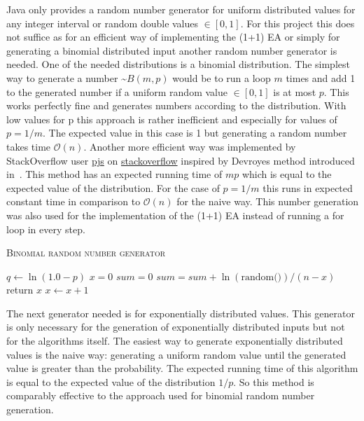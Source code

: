 Java only provides a random number generator for uniform distributed values for any integer interval or random double values $\in [0,1]$. 
For this project this does not suffice as for an efficient way of implementing the (1+1) EA or simply for generating a binomial distributed input another random number generator is needed. One of the needed distributions is a binomial distribution. The simplest way to generate a number \textasciitilde$B(m,p)$ would be to run a loop $m$ times and add 1 to the generated number if a uniform random value $\in [0,1]$ is at most $p$. This works perfectly fine and generates numbers according to the distribution. With low values for p this approach is rather inefficient and especially for values of $p=1/m$. The expected value in this case is 1 but generating a random number takes time $\mathcal{O}(n)$. Another more efficient way was implemented by StackOverflow user \href{https://stackoverflow.com/users/2166798/pjs}{pjs} on \href{https://stackoverflow.com/questions/23561551/a-efficient-binomial-random-number-generator-code-in-java}{stackoverflow} inspired by Devroyes method introduced in~\cite{devroye2006nonuniform}. This method has an expected running time of $mp$ which is equal to the expected value of the distribution. For the case of $p=1/m$ this runs in expected constant time in comparison to $\mathcal{O}(n)$ for the naive way. This number generation was also used for the implementation of the (1+1) EA instead of running a for loop in every step.

\begin{algorithm}[bt]
      \caption{\textsc{Binomial random number generator}}\label{alg:binomialRNG}

      \DontPrintSemicolon %
      $q \leftarrow \ln(1.0 - p)$\;
      $x = 0$\;
      $sum = 0$\;
      {
            $sum = sum +\ln(\text{random()}) / (n - x)$\; \tcp{random() generates a random value $\in \left[0, 1\right)$}
            {
                return $x$\;
            }
            $x \leftarrow x + 1$\;
      }
\end{algorithm}

The next generator needed is for exponentially distributed values. This generator is only necessary for the generation of exponentially distributed inputs but not for the algorithms itself. The easiest way to generate exponentially distributed values is the naive way: generating a uniform random value until the generated value is greater than the probability. The expected running time of this algorithm is equal to the expected value of the distribution $1/p$. So this method is comparably effective to the approach used for binomial random number generation. 

